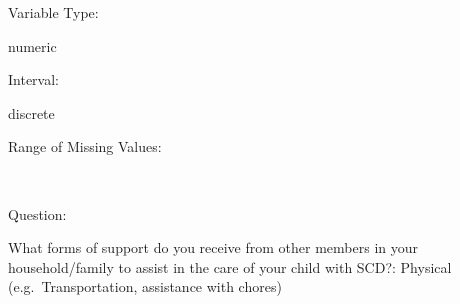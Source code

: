 \documentclass[
]{article}
\begin{document}
\begin{minipage}[t]{0.3\linewidth}

Variable Type:

\end{minipage}%
\begin{minipage}[t]{0.7\linewidth}

numeric

\end{minipage}

\begin{minipage}[t]{0.3\linewidth}

Interval:

\end{minipage}%
\begin{minipage}[t]{0.7\linewidth}

discrete

\end{minipage}

\begin{minipage}[t]{0.3\linewidth}

Range of Missing Values:

\end{minipage}%
\begin{minipage}[t]{0.7\linewidth}

~

\end{minipage}

\begin{minipage}[t]{0.3\linewidth}

Question:

\end{minipage}%
\begin{minipage}[t]{0.7\linewidth}

What forms of support do you receive from other members in your
household/family to assist in the care of your child with SCD?: Physical
(e.g.~Transportation, assistance with chores)

\end{minipage}
\end{document}
